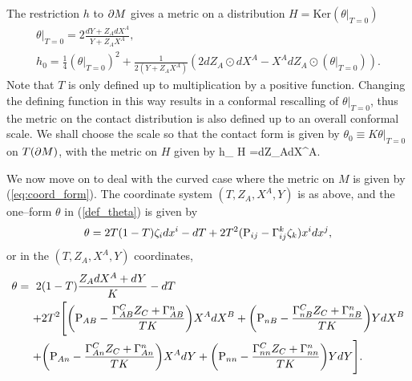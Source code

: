 The restriction $h$ to $\partial M$ gives a metric on a distribution ${ H }=\mbox{Ker} (\theta|_{T=0})$
\begin{gather}
\theta|_{T=0}=2\frac{dY+Z_A dX^A}{Y+Z_AX^A}, \nonumber \\
h_0=\frac{1}{4}{(\theta|_{T=0})}^2+\frac{1}{2(Y+Z_AX^A)}(2dZ_A\odot dX^A-X^AdZ_A\odot(\theta|_{T=0})). \label{h000}
\end{gather}
 Note that $T$ is only defined up to multiplication by a positive function. Changing the defining function in this way results in a conformal rescalling of $\theta|_{T=0}$, thus the metric on the contact distribution is also defined up to an overall conformal scale. We shall choose the scale so that
the contact form is given  by $\theta_0\equiv K\theta|_{T=0}$ on $T(\partial M)$,
with the metric on ${ H }$ given by
\be
\label{on_distri}
h_{ H }=dZ_A\odot dX^A.
\ee

We now move on to deal with the
curved case where the metric on $M$ is given by 
(\ref{eq:coord_form}).
The coordinate system $(T, Z_A, X^A, Y)$ is as above, and
the one--form $\theta$ in (\ref{def_theta}) is given by
\[
\theta=2T(1-T)\zeta_idx^i-dT+2T^2(\mathrm{P}_{ij}-\Gamma_{ij}^k\zeta_k)x^idx^j,
\]
or in the $(T, Z_A, X^A, Y)$ coordinates,
\[
\begin{split}
\theta=\ 2&(1-T)\frac{Z_AdX^A+dY}{K} - dT \\
+& 2T^2\Bigg[\bigg(\mathrm{P}_{AB}-\frac{\Gamma^C_{AB}Z_C+\Gamma^n_{AB}}{TK}\bigg)X^AdX^B 
+\bigg(\mathrm{P}_{nB}-\frac{\Gamma^C_{nB}Z_C+\Gamma^n_{nB}}{TK}\bigg)YdX^B \\
+& \bigg(\mathrm{P}_{An}-\frac{\Gamma^C_{An}Z_C+\Gamma^n_{An}}{TK}\bigg)X^AdY 
+\bigg(\mathrm{P}_{nn}-\frac{\Gamma^C_{nn}Z_C+\Gamma^n_{nn}}{TK}\bigg)YdY\Bigg].
\end{split}
\]

